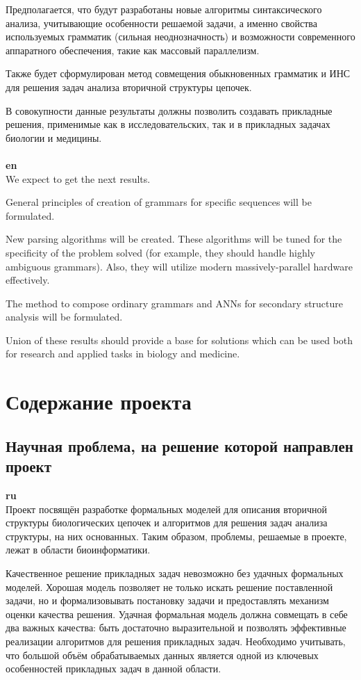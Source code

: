 \documentclass[12pt]{article}  %
\theoremstyle{remark}
\begin{document}
Предполагается, что будут разработаны новые алгоритмы синтаксического анализа, учитывающие особенности решаемой задачи, а именно свойства используемых грамматик (сильная неоднозначность) и возможности современного аппаратного обеспечения, такие как массовый параллелизм.

Также будет сформулирован метод совмещения обыкновенных грамматик и ИНС для решения задач анализа вторичной структуры цепочек.

В совокупности данные результаты должны позволить создавать прикладные решения, применимые как в исследовательских, так и в прикладных задачах биологии и медицины.
\\
\\
\textbf{en}\\
We expect to get the next results.

General principles of creation of grammars for specific sequences will be formulated.

New parsing algorithms will be created. These algorithms will be tuned for the specificity of the problem solved (for example, they should handle highly ambiguous grammars). Also, they will utilize modern massively-parallel hardware effectively.

The method to compose ordinary grammars and ANNs for secondary structure analysis will be formulated.

Union of these results should provide a base for solutions which can be used both for research and applied tasks in biology and medicine.

\section{Содержание проекта}

\subsection{Научная проблема, на решение которой направлен проект}

\textbf{ru}\\
Проект посвящён разработке формальных моделей для описания вторичной структуры биологических цепочек и алгоритмов для решения задач анализа структуры, на них основанных. Таким образом, проблемы, решаемые в проекте, лежат в области биоинформатики.

Качественное решение прикладных задач невозможно без удачных формальных моделей. Хорошая модель позволяет не только искать решение поставленной задачи, но и формализовывать постановку задачи и предоставлять механизм оценки качества решения.
Удачная формальная модель должна совмещать в себе два важных качества: быть достаточно выразительной и позволять эффективные реализации алгоритмов для решения прикладных задач.
Необходимо учитывать, что большой объём обрабатываемых данных является одной из ключевых особенностей прикладных задач в данной области.
\end{document}
